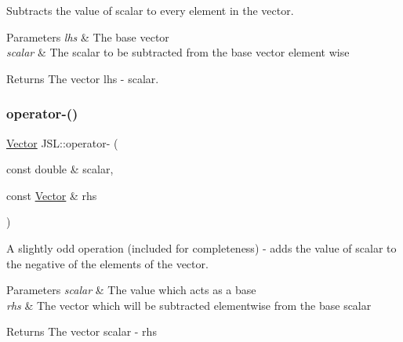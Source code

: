 Subtracts the value of scalar to every element in the vector. 


\begin{DoxyParams}{Parameters}
{\em lhs} & The base vector \\
\hline
{\em scalar} & The scalar to be subtracted from the base vector element wise \\
\hline
\end{DoxyParams}
\begin{DoxyReturn}{Returns}
The vector lhs -\/ scalar. 
\end{DoxyReturn}
\mbox{\label{namespaceJSL_ab3d17c5cc03a2048e8637d2054fbc138}} 
\subsubsection{\texorpdfstring{operator-\/()}{operator-()}\hspace{0.1cm}{\footnotesize\ttfamily [3/6]}}
{\footnotesize\ttfamily \hyperlink{classJSL_1_1Vector}{Vector} J\+S\+L\+::operator-\/ (\begin{DoxyParamCaption}\item[{const double \&}]{scalar,  }\item[{const \hyperlink{classJSL_1_1Vector}{Vector} \&}]{rhs }\end{DoxyParamCaption})\hspace{0.3cm}{\ttfamily [inline]}}



A slightly odd operation (included for completeness) -\/ adds the value of scalar to the negative of the elements of the vector. 


\begin{DoxyParams}{Parameters}
{\em scalar} & The value which acts as a base \\
\hline
{\em rhs} & The vector which will be subtracted elementwise from the base scalar \\
\hline
\end{DoxyParams}
\begin{DoxyReturn}{Returns}
The vector scalar -\/ rhs 
\end{DoxyReturn}
\mbox{\label{namespaceJSL_a4f1a2a224c7f6a8c57627b03594cd89f}} 
